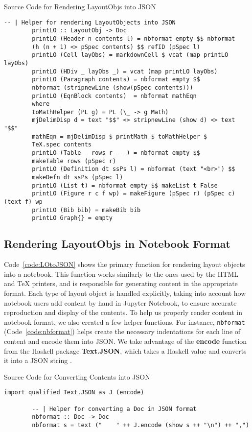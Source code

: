 \begin{listing}[h]
	\caption{Source Code for Rendering LayoutObjs into JSON}
	\label{code:LOtoJSON}
	\begin{lstlisting}[language=haskell1]
		-- | Helper for rendering LayoutObjects into JSON
		printLO :: LayoutObj -> Doc
		printLO (Header n contents l) = nbformat empty $$ nbformat 
		(h (n + 1) <> pSpec contents) $$ refID (pSpec l)
		printLO (Cell layObs) = markdownCell $ vcat (map printLO layObs)
		printLO (HDiv _ layObs _) = vcat (map printLO layObs) 
		printLO (Paragraph contents) = nbformat empty $$
		nbformat (stripnewLine (show(pSpec contents)))
		printLO (EqnBlock contents)  = nbformat mathEqn
		where
		toMathHelper (PL g) = PL (\_ -> g Math)
		mjDelimDisp d = text "$$" <> stripnewLine (show d) <> text "$$" 
		mathEqn = mjDelimDisp $ printMath $ toMathHelper $ 
		TeX.spec contents
		printLO (Table _ rows r _ _) = nbformat empty $$
		makeTable rows (pSpec r)
		printLO (Definition dt ssPs l) = nbformat (text "<br>") $$ 
		makeDefn dt ssPs (pSpec l)
		printLO (List t) = nbformat empty $$ makeList t False
		printLO (Figure r c f wp) = makeFigure (pSpec r) (pSpec c) (text f) wp
		printLO (Bib bib) = makeBib bib
		printLO Graph{} = empty 
	\end{lstlisting}
\end{listing}

\subsection{Rendering LayoutObjs in Notebook Format}
Code~\ref{code:LOtoJSON} shows the primary function for rendering layout 
objects into a notebook. This function works similarly to the ones used by the 
HTML and TeX printers, and is responsible for generating content in the 
appropriate format. Each type of layout object is handled explicitly, taking 
into account how notebook users add content by hand in Jupyter Notebook, to 
ensure accurate reproduction and display of the contents. To help us properly 
render content in notebook format, we also created a few helper functions. For 
instance, \texttt{nbformat} (Code~\ref{code:nbformat}) helps create the 
necessary indentations for each line of content and encode them into JSON. We 
take advantage of the \textbf{encode} function from the Haskell package 
\textbf{Text.JSON}, which takes a Haskell value and converts it into a JSON 
string \cite{textdotjosn}. 

\begin{listing}[h]
	\caption{Source Code for Converting Contents into JSON}
	\label{code:nbformat}
	\begin{lstlisting}[language=haskell1]
		import qualified Text.JSON as J (encode) 
		
		-- | Helper for converting a Doc in JSON format
		nbformat :: Doc -> Doc
		nbformat s = text ("    " ++ J.encode (show s ++ "\n") ++ ",")
	\end{lstlisting}
\end{listing}

